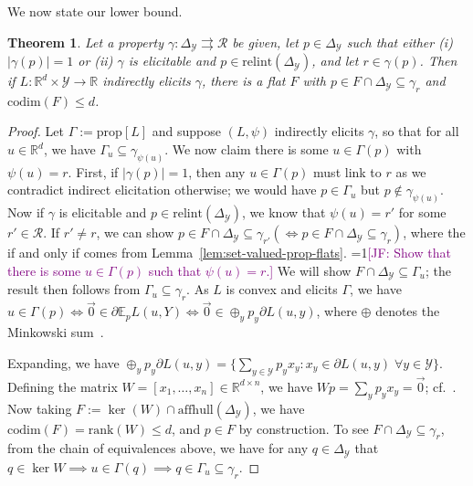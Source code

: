 \documentclass{article}
\newcommand{\Comments}{1}
\newcommand{\mynote}[2]{\ifnum\Comments=1\textcolor{#1}{#2}\fi}
\newcommand{\jessie}[1]{\mynote{purple}{[JF: #1]}}
\newcommand{\reals}{\mathbb{R}}
\newcommand{\simplex}{\Delta_\Y}
\newcommand{\relint}[1]{\mathrm{relint}(#1)}
\newcommand{\prop}[1]{\mathrm{prop}[#1]}
\newcommand{\codim}{\mathrm{codim}}
\newcommand{\rank}{\mathrm{rank}}
\newcommand{\affhull}{\mathrm{affhull}}
\newcommand{\E}{\mathbb{E}}
\newcommand{\R}{\mathcal{R}}
\newcommand{\Y}{\mathcal{Y}}
\newcommand{\exploss}[3]{\E_{#3} #1(#2,Y)}
\newcommand{\toto}{\rightrightarrows}
\newtheorem{theorem}{Theorem}
\begin{document}
We now state our lower bound.

\begin{theorem}\label{thm:cvx-flats}
  Let a property $\gamma:\simplex\toto\R$ be given, let $p\in\simplex$ such that either (i) $|\gamma(p)|=1$ or (ii) $\gamma$ is elicitable and $p\in\relint\simplex$, and let $r\in\gamma(p)$.
Then if $L: \reals^d \times \Y \to \reals$ indirectly elicits $\gamma$, there is a flat $F$ with $p\in F \cap \simplex \subseteq \gamma_r$ and $\codim(F) \leq d$.
\end{theorem}
\begin{proof}
	Let $\Gamma := \prop{L}$ and suppose $(L, \psi)$ indirectly elicits $\gamma$, so that for all $u \in \reals^d$, we have $\Gamma_u \subseteq \gamma_{\psi(u)}$.
	We now claim there is some $u \in \Gamma(p)$ with $\psi(u) = r$.
	First, if $|\gamma(p)| = 1$, then any $u \in \Gamma(p)$ must link to $r$ as we contradict indirect elicitation otherwise; we would have $p \in \Gamma_u$ but $p \not \in \gamma_{\psi(u)}$.
	Now if $\gamma$ is elicitable and $p \in \relint{\simplex}$, we know that $\psi(u) = r'$ for some $r' \in \R$.%
	If $r' \neq r$, we can show $p \in F \cap \simplex \subseteq \gamma_{r'} (\iff p \in F \cap \simplex \subseteq \gamma_{r})$, where the if and only if comes from Lemma~\ref{lem:set-valued-prop-flats}.
  \jessie{Show that there is some $u \in \Gamma(p)$ such that $\psi(u) = r$.}
	We will show $F \cap \simplex \subseteq \Gamma_u$; the result then follows from $\Gamma_u \subseteq \gamma_r$.
	As $L$ is convex and elicits $\Gamma$, we have $u \in \Gamma(p) \iff \vec 0 \in \partial \exploss{L}{u}{p} \iff \vec 0 \in \oplus_y p_y \partial L(u,y)$, where $\oplus$ denotes the Minkowski sum~\citep[Theorem 4.1.1]{hiriart2012fundamentals}.
	
	Expanding, we have $\oplus_y p_y \partial L(u,y) = \{ \sum_{y\in\Y} p_y x_y : x_y \in \partial L(u,y) \; \forall y\in\Y\}$.
	Defining the matrix $W = [x_1, \ldots, x_n] \in \reals^{d\times n}$, we have $W p = \sum_y p_y x_y = \vec 0$;
  cf.~\cite[$\mathbf{A}^m$ in Theorem 16]{ramaswamy2016convex}.
	Now taking $F := \ker(W) \cap \affhull(\simplex)$, we have $\codim(F) = \rank(W) \leq d$, and $p \in F$ by construction.
  To see $F \cap \simplex \subseteq \gamma_r$, from the chain of equivalences above, we have for any $q\in\simplex$ that $q \in \ker W \implies u \in \Gamma(q) \implies q \in \Gamma_u \subseteq \gamma_r$.
\end{proof}
\end{document}
